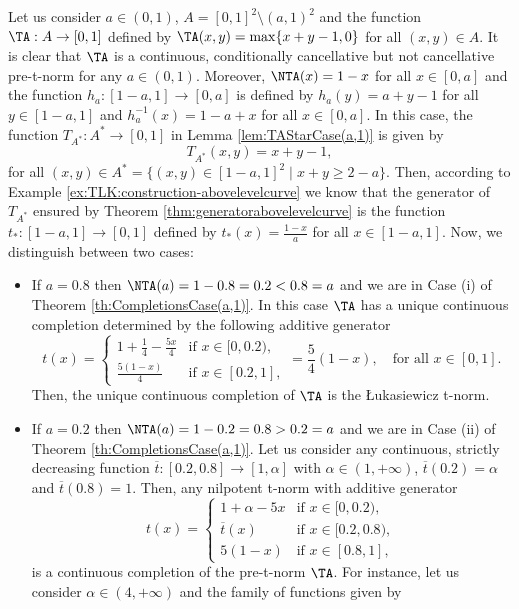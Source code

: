 \begin{example}\label{example:compl:can:(a,1)}
	Let us consider $a \in (0,1)$, $A=[0,1]^2 \setminus (a,1)^2$ and the function $\TA:A \to [0,1]$ defined by $\TA(x,y)=\max \{x+y-1,0\}$ for all $(x,y) \in A$. It is clear that $\TA$ is a continuous, conditionally cancellative but not cancellative pre-t-norm for any $a \in (0,1)$. Moreover, $\NTA(x)=1-x$ for all $x \in [0,a]$ and the function $h_a:[1-a,1] \to [0,a]$ is defined by $h_a(y)=a+y-1$ for all $y \in [1-a,1]$ and $h_a^{-1}(x)=1-a+x$ for all $x \in [0,a]$. In this case, the function $T_{A^*} : A^* \to [0,1]$ in Lemma \ref{lem:TAStarCase(a,1)} is given by
	$$T_{A^*}(x,y)=x+y-1, $$
	for all $(x,y) \in A^*=\{(x,y) \in [1-a,1]^2  \mid x+y \geq 2-a\}$. Then, according to Example \ref{ex:TLK:construction-abovelevelcurve} we know that the generator of $T_{A^*}$ ensured by Theorem \ref{thm:generatorabovelevelcurve} is the function $t_*:[1-a,1] \to [0,1]$
	defined by $t_*(x)=\frac{1-x}{a}$ for all $x \in [1-a,1]$. Now, we distinguish between two cases:
	\begin{itemize}
		\item If $a=0.8$ then $\NTA(a)=1-0.8=0.2 < 0.8=a$ and we are in Case (i) of Theorem \ref{th:CompletionsCase(a,1)}. In this case $\TA$ has a unique continuous completion determined by the following additive generator
		$$
		t(x)
		=
		\left\{ \begin{array}{ll}
			1 + \frac{1}{4}-\frac{5x}{4} & \text{if } x \in [0,0.2), \\
			\frac{5(1-x)}{4} & \text{if } x \in [0.2,1],
		\end{array} \right.
		=
		\frac{5}{4}(1-x), \quad \text{for all } x \in [0,1].
		$$
		Then, the unique continuous completion of $\TA$ is the Łukasiewicz t-norm.
		\item If $a=0.2$ then $\NTA(a)=1-0.2=0.8 > 0.2=a$ and we are in Case (ii) of Theorem \ref{th:CompletionsCase(a,1)}. Let us consider any continuous, strictly decreasing function $\overline{t}:[0.2,0.8] \to [1,\alpha]$ with $\alpha \in (1,+\infty)$, $\overline{t}(0.2)=\alpha$ and $\overline{t}(0.8)=1$. Then, any nilpotent t-norm with additive generator
		$$
		t(x)
		=
		\left\{ \begin{array}{ll}
			1 + \alpha -5x & \text{if } x \in [0,0.2), \\
			\overline{t}(x) & \text{if } x \in [0.2,0.8),\\
			5 (1 - x) & \text{if } x \in [0.8,1],
		\end{array} \right.
		$$
		is a continuous completion of the pre-t-norm $\TA$. For instance, let us consider $\alpha\in (4,+\infty)$ and the family of functions given by

\end{itemize}
\end{example}
